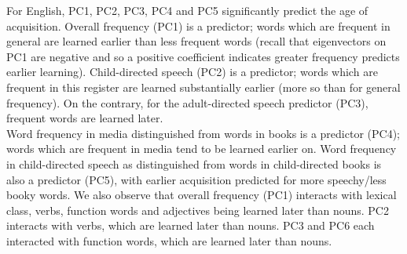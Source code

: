 \documentclass[10pt, letterpaper]{article}
\begin{document}
For English, PC1, PC2, PC3, PC4 and PC5 significantly predict the age of
acquisition. Overall frequency (PC1) is a predictor; words which are
frequent in general are learned earlier than less frequent words (recall
that eigenvectors on PC1 are negative and so a positive coefficient
indicates greater frequency predicts earlier learning). Child-directed
speech (PC2) is a predictor; words which are frequent in this register
are learned substantially earlier (more so than for general frequency).
On the contrary, for the adult-directed speech predictor (PC3), frequent
words are learned later.\\
Word frequency in media distinguished from words in books is a predictor
(PC4); words which are frequent in media tend to be learned earlier on.
Word frequency in child-directed speech as distinguished from words in
child-directed books is also a predictor (PC5), with earlier acquisition
predicted for more speechy/less booky words. We also observe that
overall frequency (PC1) interacts with lexical class, verbs, function
words and adjectives being learned later than nouns. PC2 interacts with
verbs, which are learned later than nouns. PC3 and PC6 each interacted
with function words, which are learned later than nouns.
\end{document}

